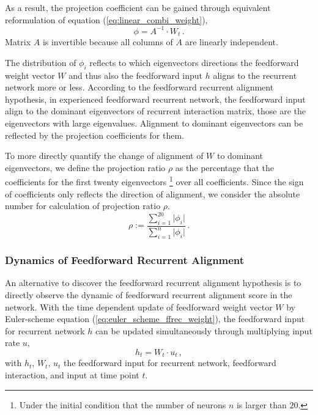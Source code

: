 \documentclass[11pt]{article}
\begin{document}
{	As a result, the projection coefficient can be gained through equivalent reformulation of equation (\ref{eq:linear_combi_weight}), 
		\begin{equation} \label{eq:calculation_ratio}
			\phi = A^{-1} \cdot W_t \, .
		\end{equation}
	Matrix $A$ is invertible because all columns of $A$ are linearly independent. 
	
	The distribution of $\phi_i$ reflects to which eigenvectors directions the feedforward weight vector $W$ and thus also the feedforward input $h$ aligns to the recurrent network more or less. According to the feedforward recurrent alignment hypothesis, in experienced feedforward recurrent network, the feedforward input align to the dominant eigenvectors of recurrent interaction matrix, those are the eigenvectors with large eigenvalues. Alignment to dominant eigenvectors can be reflected by the projection coefficients for them. 
	
	To more directly quantify the change of alignment of $W$ to dominant eigenvectors, we define the projection ratio $\rho$ as the percentage that the coefficients for the first twenty eigenvectors \footnote{Under the initial condition that the number of neurons $n$ is larger than $20$. } over all coefficients. Since the sign of coefficients only reflects the direction of alignment, we consider the absolute number for calculation of projection ratio $\rho$.
		\begin{equation} \label{eq:projection_ratio}
			\rho := \frac{\sum_{i=1}^{20} \vert \phi_i \vert}{\sum_{i=1}^{n} \vert \phi_i \vert} \, .
		\end{equation}
		
	\subsubsection{Dynamics of Feedforward Recurrent Alignment}
	
	An alternative to discover the feedforward recurrent alignment hypothesis is to directly observe the dynamic of feedforward recurrent alignment score in the network. With the time dependent update of feedforward weight vector $W$ by Euler-scheme equation (\ref{eq:euler_scheme_ffrec_weight}), the feedforward input for recurrent network $h$ can be updated simultaneously through multiplying input rate $u$, 
		\begin{equation} \label{eq:feedforward_input}
			h_t = W_t \cdot u_t \, ,
		\end{equation}
	with $h_t,\, W_t, \, u_t$ the feedforward input for recurrent network, feedforward interaction, and input at time point $t$. 
	
}
\end{document}
